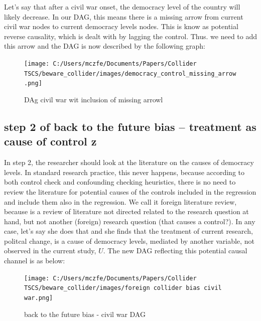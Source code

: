 \documentclass[
  super,
  preprint,
  3p]{elsarticle}
\begin{document}
Let's say that after a civil war onset, the democracy level of the
country will likely decrease. In our DAG, this means there is a missing
arrow from current civil war nodes to current democracy levels nodes.
This is know as potential reverse causality, which is dealt with by
lagging the control. Thus. we need to add this arrow and the DAG is now
described by the following graph:

\begin{figure}

{\centering \texttt{[image: C:/Users/mczfe/Documents/Papers/Collider TSCS/beware\_collider/images/democracy\_control\_missing\_arrow.png]}

}

\caption{DAg civil war wit inclusion of missing arrowl}

\end{figure}

\hypertarget{step-2-of-back-to-the-future-bias-treatment-as-cause-of-control-z}{%
\subsection{step 2 of back to the future bias -- treatment as cause of
control
z}\label{step-2-of-back-to-the-future-bias-treatment-as-cause-of-control-z}}

In step 2, the researcher should look at the literature on the causes of
democracy levels. In standard research practice, this never happens,
because according to both control check and confounding checking
heuristics, there is no need to review the literature for potential
causes of the controls included in the regression and include them also
in the regression. We call it foreign literature review, because is a
review of literature not directed related to the research question at
hand, but not another (foreign) research question (that causes a
control?). In any case, let's say she does that and she finds that the
treatment of current research, politcal change, is a cause of democracy
levels, mediated by another variable, not observed in the current study,
\(U\). The new DAG reflecting this potential causal channel is as below:

\begin{figure}

{\centering \texttt{[image: C:/Users/mczfe/Documents/Papers/Collider TSCS/beware\_collider/images/foreign collider bias civil war.png]}

}

\caption{back to the future bias - civil war DAG}

\end{figure}
\end{document}

